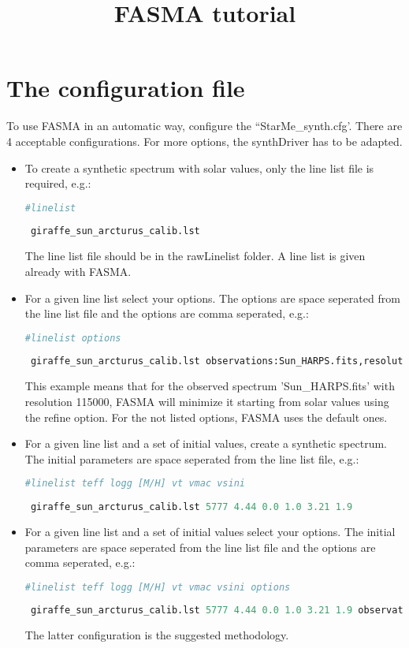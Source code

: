 \documentclass[a4paper,10pt]{article}
\title{FASMA tutorial}
\author{}
\begin{document}
\maketitle


\section{The configuration file}

To use FASMA in an automatic way, configure the ``StarMe\_synth.cfg'. There are 4 acceptable configurations. For more options, the synthDriver has to be adapted. 

\begin{itemize}
 \item To create a synthetic spectrum with solar values, only the line list file is required, e.g.:
 \begin{lstlisting}[language=Python]
 #linelist 
 
 giraffe_sun_arcturus_calib.lst 
\end{lstlisting}
The line list file should be in the rawLinelist folder. A line list is given already with FASMA.
 \item For a given line list select your options. The options are space seperated from the line list file and the options are comma seperated, e.g.: 
 {\footnotesize 
 \begin{lstlisting}[language=Python]
 #linelist options
  
 giraffe_sun_arcturus_calib.lst observations:Sun_HARPS.fits,resolution:115000,minimize,refine
\end{lstlisting}}
This example means that for the observed spectrum 'Sun\_HARPS.fits' with resolution 115000, FASMA will minimize it starting from solar values using the refine option. 
For the not listed options, FASMA uses the default ones. 

 \item For a given line list and a set of initial values, create a synthetic spectrum. The initial parameters are space seperated from the line list file, e.g.: 
 \begin{lstlisting}[language=Python]
 #linelist teff logg [M/H] vt vmac vsini
  
 giraffe_sun_arcturus_calib.lst 5777 4.44 0.0 1.0 3.21 1.9 
\end{lstlisting}

 \item For a given line list and a set of initial values select your options. The initial parameters are space seperated from the line list file and the options are comma seperated, e.g.: 
 {\tiny 
 \begin{lstlisting}[language=Python]
 #linelist teff logg [M/H] vt vmac vsini options
  
 giraffe_sun_arcturus_calib.lst 5777 4.44 0.0 1.0 3.21 1.9 observations:Sun_HARPS.fits,resolution:115000,minimize,vt,vmac,refine
\end{lstlisting} }
The latter configuration is the suggested methodology. 

\end{itemize}
\end{document}
